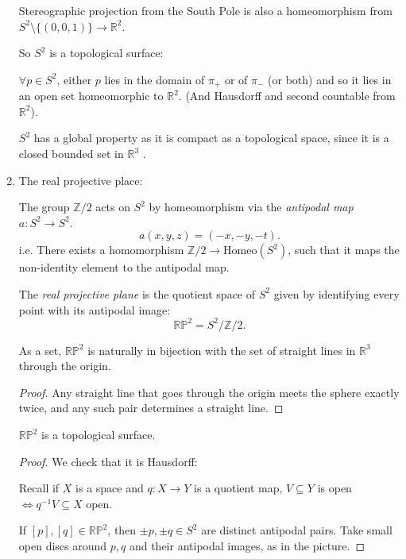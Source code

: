 \begin{eg}
\begin{enumerate}
\begin{note}
            Stereographic projection from the South Pole is also a homeomorphism from \(S^2 \setminus \{(0,0,1)\} \to \mathbb{R}^2\). 
        \end{note}
        So \(S^2\) is a topological surface:

        \(\forall p \in S^2\), either \(p\) lies in the domain of \(\pi_+\) or of \(\pi_-\) (or both) and so it lies in an open set homeomorphic to \(\mathbb{R}^2\). (And Hausdorff and second countable from \(\mathbb{R}^2\)).
        \begin{remark}
            \(S^2\) has a global property as it is compact as a topological space, since it is a closed bounded set in \(\mathbb{R}^3\) .
        \end{remark}
        \item The real projective place:
        
        The group \(\mathbb{Z} / 2\) acts on \(S^2\) by homeomorphism via the \textit{antipodal map} \(a: S^2 \to S^2\).
        \[
            a(x,y,z) = (-x,-y,-t).
        \]
        i.e. There exists a homomorphism \(\mathbb{Z} / 2 \to  \mathrm{Homeo} (S^2)\), such that it maps the non-identity element to the antipodal map.

        \begin{definition}
            The \textit{real projective plane} is the quotient space of \(S^2\) given by identifying every point with its antipodal image:
            \[
                \mathbb{RP}^2 = S^2 / \mathbb{Z}/ 2.
            \]
        \end{definition}

        \begin{lemma}
            As a set, \(\mathbb{RP}^2\) is naturally in bijection with the set of straight lines in \(\mathbb{R}^3\) through the origin.
        \end{lemma}
        \begin{proof}
             Any straight line that goes through the origin meets the sphere exactly twice, and any such pair determines a straight line.
        \end{proof}
        \begin{lemma}
            \(\mathbb{RP}^2\) is a topological surface.
        \end{lemma}
        \begin{proof}
            We check that it is Hausdorff:

            Recall if \(X\) is a space and \(q: X \to Y\) is a quotient map, \(V \subseteq Y\) is open \(\iff q^{-1}V \subseteq X\) open. 

            If \([p],[q] \in \mathbb{RP}^2\), then \(\pm p, \pm q \in S^2\) are distinct antipodal pairs. Take small open discs around \(p,q\) and their antipodal images, as in the picture.
        \end{proof}
    \end{enumerate}
\end{eg}